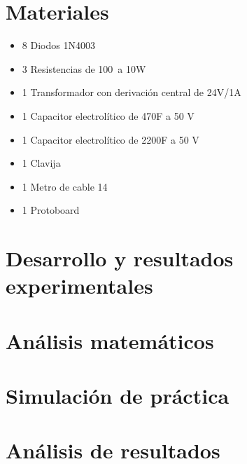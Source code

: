 \documentclass[12pt]{article}
\begin{document}
        \section*{Materiales}
        \label{sec:materiales}
        \begin{itemize}
            \item [] 8 \qquad Diodos 1N4003
            \item [] 3 \qquad Resistencias de 100\textOmega\ a 10W
            \item [] 1 \qquad Transformador con derivación central de 24V/1A
            \item [] 1 \qquad Capacitor electrolítico de 470\textmu F a 50 V
            \item [] 1 \qquad Capacitor electrolítico de 2200\textmu F a 50 V
            \item [] 1 \qquad Clavija
            \item [] 1 \qquad Metro de cable 14
            \item [] 1 \qquad Protoboard
        \end{itemize}
        
        
        \section*{Desarrollo y resultados experimentales}
        \label{sec:desarrollo}

        \section*{Análisis matemáticos}
        \label{sec:calculos}

        \section*{Simulación de práctica}
        \label{sec:simulador}

        \section*{Análisis de resultados}
        \label{sec:resultados}
\end{document}
